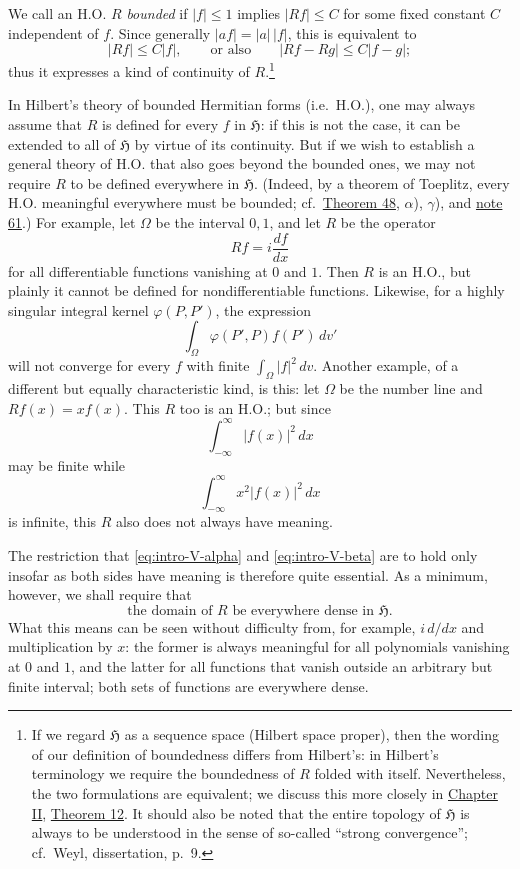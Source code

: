 ﻿\documentclass[paper=b5,fontsize=13pt,bookmarkpackage=false,twoside]{scrartcl}
\begin{document}
We call an H.O. $R$ \emph{bounded} if $|f|\le1$ implies $|Rf|\le C$ for some fixed constant $C$ independent of $f$. Since generally $|af|=|a|\,|f|$, this is equivalent to
\[
 |Rf|\le C|f|,
 \qquad\text{or also}\qquad
 |Rf-Rg|\le C|f-g|;
\]
thus it expresses a kind of continuity of $R$.\footnote{\label{fn:source-12}If we regard $\mathfrak H$ as a sequence space (Hilbert space proper), then the wording of our definition of boundedness differs from Hilbert's: in Hilbert's terminology we require the boundedness of $R$ folded with itself. Nevertheless, the two formulations are equivalent; we discuss this more closely in \hyperref[chap:II]{Chapter II}, \hyperref[thm:12]{Theorem 12}. It should also be noted that the entire topology of $\mathfrak H$ is always to be understood in the sense of so-called ``strong convergence''; cf.\ Weyl, dissertation, p.~9.}

In Hilbert's theory of bounded Hermitian forms (i.e.\ H.O.), one may always assume that $R$ is defined for every $f$ in $\mathfrak H$: if this is not the case, it can be extended to all of $\mathfrak H$ by virtue of its continuity. But if we wish to establish a general theory of H.O. that also goes beyond the bounded ones, we may not require $R$ to be defined everywhere in $\mathfrak H$. (Indeed, by a theorem of Toeplitz, every H.O. meaningful everywhere must be bounded; cf.\ \hyperref[thm:48]{Theorem 48}, $\alpha$), $\gamma$), and \hyperref[fn:61]{note 61}.) For example, let $\Omega$ be the interval $0,1$, and let $R$ be the operator
\[
 Rf=i\frac{df}{dx}
\]
for all differentiable functions vanishing at $0$ and $1$. Then $R$ is an H.O., but plainly it cannot be defined for nondifferentiable functions. Likewise, for a highly singular integral kernel $\varphi(P,P')$, the expression
\[
 \int_\Omega\varphi(P',P)f(P')\,dv'
\]
will not converge for every $f$ with finite $\int_\Omega|f|^2\,dv$. Another example, of a different but equally characteristic kind, is this: let $\Omega$ be the number line and $Rf(x)=x f(x)$. This $R$ too is an H.O.; but since
\[
 \int_{-\infty}^{\infty}|f(x)|^2\,dx
\]
may be finite while
\[
 \int_{-\infty}^{\infty}x^2|f(x)|^2\,dx
\]
is infinite, this $R$ also does not always have meaning.

The restriction that \eqref{eq:intro-V-alpha} and \eqref{eq:intro-V-beta} are to hold only insofar as both sides have meaning is therefore quite essential. As a minimum, however, we shall require that
\begin{equation}
 \text{the domain of $R$ be everywhere dense in $\mathfrak H$.}
 \tag{$\gamma$}\label{eq:intro-V-gamma}
\end{equation}
What this means can be seen without difficulty from, for example, $i\,d/dx$ and multiplication by $x$: the former is always meaningful for all polynomials vanishing at $0$ and $1$, and the latter for all functions that vanish outside an arbitrary but finite interval; both sets of functions are everywhere dense.
\end{document}
